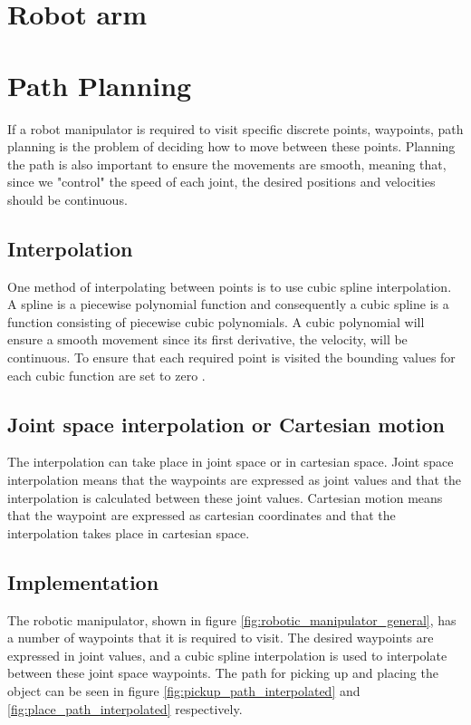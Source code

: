 \section*{Robot arm}



\section*{Path Planning}
If a robot manipulator is required to visit specific discrete points, waypoints, path planning is the problem of deciding how to move between these points. Planning the path is also important to ensure the movements are smooth, meaning that, since we "control" the speed of each joint, the desired positions and velocities should be continuous.
\subsection{Interpolation}
One method of interpolating between points is to use cubic spline interpolation. A spline \cite{spline_wolfram} is a piecewise polynomial function and consequently a cubic spline is a function consisting of piecewise cubic polynomials. A cubic polynomial will ensure a smooth movement since its first derivative, the velocity, will be continuous. To ensure that each required point is visited the bounding values for each cubic function are set to zero \cite{cubic_spline_wolfram}.

\subsection*{Joint space interpolation or Cartesian motion}
The interpolation can take place in joint space or in cartesian space. Joint space interpolation means that the waypoints are expressed as joint values and that the interpolation is calculated between these joint values. Cartesian motion means that the waypoint are expressed as cartesian coordinates and that the interpolation takes place in cartesian space.

\subsection*{Implementation} %
The robotic manipulator, shown in figure \ref{fig:robotic_manipulator_general}, has a number of waypoints that it is required to visit. The desired waypoints are expressed in joint values, and a cubic spline interpolation is used to interpolate between these joint space waypoints. The path for picking up and placing the object can be seen in figure \ref{fig:pickup_path_interpolated} and \ref{fig:place_path_interpolated} respectively.

